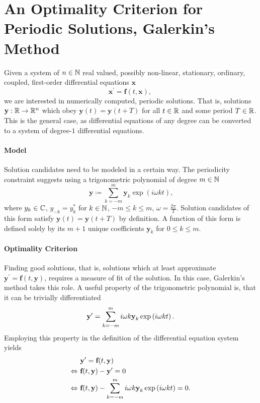 \section{An Optimality Criterion for Periodic Solutions, Galerkin's Method}

Given a system of $n \in \mathbb{N}$ real valued, possibly non-linear, stationary, ordinary, coupled, first-order differential equations $\textbf{x}$
\[
	\textbf{x}^\prime = \textbf{f}(t, \textbf{x}) \text{, }
\]
we are interested in numerically computed, periodic solutions.
That is, solutions $\textbf{y}: \mathbb{R} \to \mathbb{R}^n$ which obey $\textbf{y}(t) = \textbf{y}(t+T)$ for all $t \in \mathbb{R}$ and some period $T \in \mathbb{R}$.
This is the general case, as differential equations of any degree can be converted to a system of degree-$1$ differential equations.

\paragraph{Model} Solution candidates need to be modeled in a certain way.
The periodicity constraint suggests using a trigonometric polynomial of degree $m \in \mathbb{N}$
\[
	\textbf{y} \coloneqq \sum_{k = -m}^m \textbf{y}_k \exp\left(i \omega k t\right) \text{,}
\]
where $y_k \in \mathbb{C}$, $y_{-k} = y_k^*$ for $k \in \mathbb{N}$, $-m \le k \le m$, $\omega = \frac{2\pi}T$.
Solution candidates of this form satisfy $\textbf{y}(t) = \textbf{y}(t+T)$ by definition.
A function of this form is defined solely by its $m+1$ unique coefficients $\textbf{y}_k$ for $0 \le k \le m$.

\paragraph{Optimality Criterion} Finding good solutions, that is, solutions which at least approximate $\textbf{y}^\prime = \textbf{f}(t, \textbf{y})$, requires a measure of fit of the solution.
In this case, Galerkin's method takes this role.
A useful property of the trigonometric polynomial is, that it can be trivially differentiated
\[
	\textbf{y}^\prime = \sum_{k = -m}^m i \omega k \textbf{y}_k \exp\left(i \omega k t\right) \text.
\]
Employing this property in the definition of the differential equation system yields
\begin{align*}
		& \textbf{y}^\prime = \textbf{f}(t,\textbf{y})\\
	\Leftrightarrow\ & \textbf{f}(t,\textbf{y}) - \textbf{y}^\prime = 0\\
	\Leftrightarrow\ & \textbf{f}(t,\textbf{y}) - \sum_{k = -m}^m i \omega k \textbf{y}_k \exp\left(i \omega k t\right) = 0 \text.
\end{align*}

